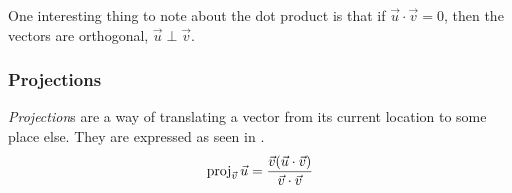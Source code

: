 One interesting thing to note about the dot product is that if $\vec{u} \cdot \vec{v} = 0$, then the vectors are orthogonal, $\vec{u} \perp \vec{v}$.

\subsubsection{Projections}\label{subsubsec:Projections}
\begin{definition}[Projection]\label{def:Projection}
  \emph{Projection}s are a way of translating a vector from its current location to some place else.
  They are expressed as seen in .
  \begin{equation}\label{eq:Projection}
    \operatorname{\text{proj}}_{\vec{v}} \vec{u} = \frac{\vec{v} (\vec{u} \cdot \vec{v})}{\vec{v} \cdot \vec{v}}
  \end{equation}
\end{definition}

